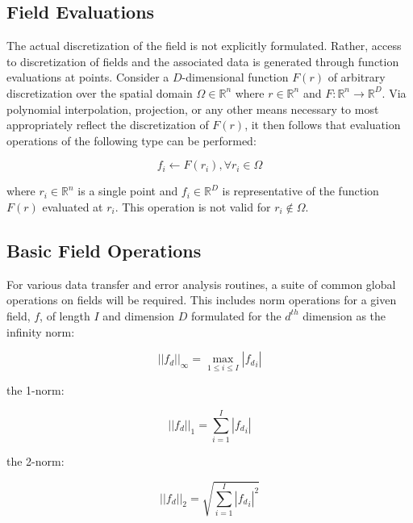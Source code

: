 \documentclass[letterpaper,12pt]{article}
\begin{document}
\subsection{Field Evaluations}\label{subsec:field_eval}
The actual discretization of the field is not explicitly
formulated. Rather, access to discretization of fields and the
associated data is generated through function evaluations at
points. Consider a $D$-dimensional function $F(r)$ of arbitrary
discretization over the spatial domain $\Omega \in \mathbb{R}^n$ where
$r \in \mathbb{R}^n$ and $F : \mathbb{R}^n \rightarrow
\mathbb{R}^D$. Via polynomial interpolation, projection, or any other
means necessary to most appropriately reflect the discretization of
$F(r)$, it then follows that evaluation operations of the following
type can be performed:

\begin{equation}
  f_i \leftarrow F(r_i), \forall r_i \in \Omega
  \label{eq:evaluation}
\end{equation}

where $r_i \in \mathbb{R}^n$ is a single point and $f_i \in
\mathbb{R}^D$ is representative of the function $F(r)$ evaluated at
$r_i$. This operation is not valid for $r_i \notin \Omega$.


\subsection{Basic Field Operations}\label{subsec:field_ops}
For various data transfer and error analysis routines, a suite of
common global operations on fields will be required. This includes
norm operations for a given field, $f$, of length $I$ and dimension
$D$ formulated for the $d^{th}$ dimension as the infinity norm:

\begin{equation}
  ||f_d||_\infty = \max_{1 \leq i \leq I} |{f_d}_i|
  \label{eq:infinity_norm}
\end{equation}

the 1-norm:

\begin{equation}
  ||f_d||_1 = \sum_{i=1}^I |{f_d}_i|
  \label{eq:one_norm}
\end{equation}

the 2-norm:

\begin{equation}
  ||f_d||_2 = \sqrt{ \sum_{i=1}^I |{f_d}_i|^2 }
  \label{eq:two_norm}
\end{equation}
\end{document}
